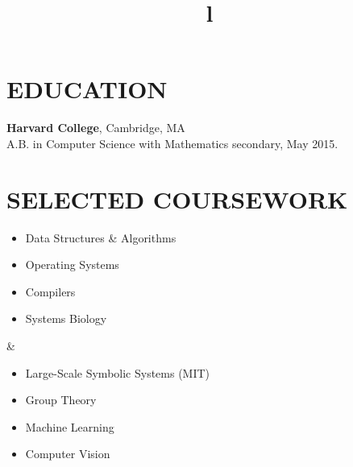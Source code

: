 \documentclass[centered, margin, 10pt]{res} %
\title{l}\\
\newenvironment{rlist}
    {\begin{minipage}[t]{\linewidth}\begin{itemize}\raggedright}
    {\end{itemize}\end{minipage}}
\begin{document}

\address{af@aaronfrary.com}


\begin{resume}


\section{EDUCATION}

{\bf Harvard College}, Cambridge, MA
\\
A.B. in Computer Science with Mathematics secondary, May 2015.


\section{SELECTED COURSEWORK}

\begin{ncolumn}{2}
  \begin{rlist}
    \item Data Structures \& Algorithms
    \item Operating Systems
    \item Compilers
    \item Systems Biology
  \end{rlist}
  &
  \begin{rlist}
    \item Large-Scale Symbolic Systems (MIT)
    \item Group Theory
    \item Machine Learning
    \item Computer Vision
  \end{rlist}
\end{ncolumn}


\end{resume}
\end{document}
